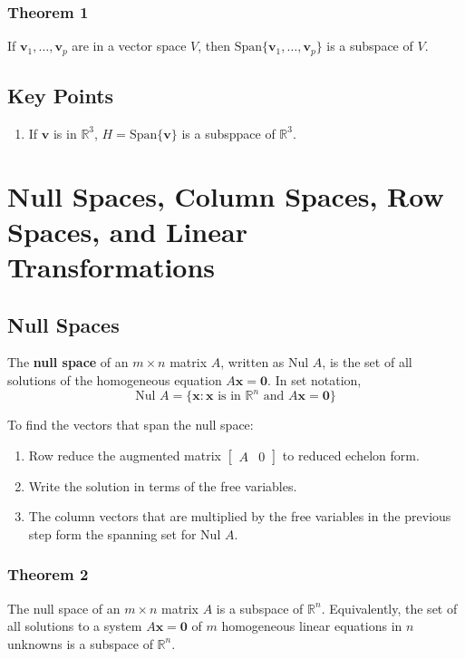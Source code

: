 \documentclass{article}
\begin{document}
\subsubsection*{Theorem 1}
If $\mathbf{v}_1,\ldots, \mathbf{v}_p$ are in a vector space $V$, then $\text{Span}\{\mathbf{v}_1,\ldots, \mathbf{v}_p\}$ is a subspace of $V$.

\subsection*{Key Points}
\begin{enumerate}
    \item If $\mathbf{v}$ is in $\mathbb{R}^3$, $H=\text{Span}\{\mathbf{v}\}$ is a subsppace of $\mathbb{R}^3$.
\end{enumerate}

\pagebreak

\section*{Null Spaces, Column Spaces, Row Spaces, and Linear Transformations}
\subsection*{Null Spaces}
The \textbf{null space} of an $m\times n$ matrix $A$, written as $\text{Nul } A$, is the set of all solutions of the homogeneous equation $A\mathbf{x}=\mathbf{0}$. In set notation,
\[\text{Nul } A = \{\mathbf{x} : \mathbf{x} \text{ is in } \mathbb{R}^n \text{ and } A\mathbf{x}=\mathbf{0}\}\]

To find the vectors that span the null space:
\begin{enumerate}
    \item Row reduce the augmented matrix $\begin{bmatrix}A & 0\end{bmatrix}$ to reduced echelon form.
    \item Write the solution in terms of the free variables.
    \item The column vectors that are multiplied by the free variables in the previous step form the spanning set for $\text{Nul } A$.
\end{enumerate}

\subsubsection*{Theorem 2}
The null space of an $m\times n$ matrix $A$ is a subspace of $\mathbb{R}^n$. Equivalently, the set of all solutions to a system $A\mathbf{x}=\mathbf{0}$ of $m$ homogeneous linear equations in $n$ unknowns is a subspace of $\mathbb{R}^n$.
\end{document}
